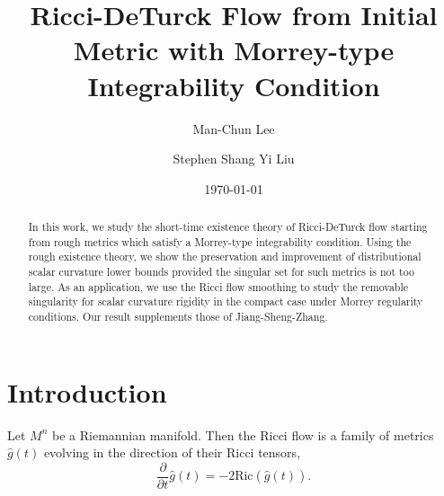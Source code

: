 \documentclass[12pt]{amsart}
\theoremstyle{plain}
\theoremstyle{plain}
\theoremstyle{definition}
\theoremstyle{remark}
\numberwithin{equation}{subsection}
\begin{document}
\title[]
{Ricci-DeTurck Flow from Initial Metric with Morrey-type Integrability Condition}

\author{Man-Chun Lee}
\address[Man-Chun Lee]{Room 237, Lady Shaw Building,
The Chinese University of Hong Kong,
Shatin, N.T., Hong Kong}

\author{Stephen Shang Yi Liu}
\address[Stephen Shang Yi Liu]{Room 222A, Lady Shaw Building,
The Chinese University of Hong Kong,
Shatin, N.T., Hong Kong}

\renewcommand{\subjclassname}{
  \textup{2010} Mathematics Subject Classification}

\date{\today}

\begin{abstract}
  In this work, we study the short-time existence theory of Ricci-DeTurck flow starting from rough metrics which satisfy a Morrey-type integrability condition. Using the rough existence theory, we show the preservation and improvement of distributional scalar curvature lower bounds  provided the singular set for such metrics is not too large. As an application, we use the Ricci flow smoothing to study the removable singularity for scalar curvature rigidity in the compact case under Morrey regularity conditions. Our result supplements those of Jiang-Sheng-Zhang.
\end{abstract}


\maketitle

\section{Introduction}\label{sec:introduction}

Let $M^n$ be a Riemannian manifold. Then the Ricci flow is a family of metrics $\hat g(t)$ evolving in the direction of their Ricci tensors,
\begin{equation*}
    \frac{\partial}{\partial t} \hat g(t) = -2\text{Ric}(\hat g(t)).
\end{equation*}
\end{document}

